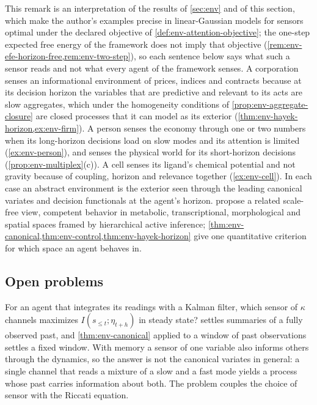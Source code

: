 \begin{remark}\label{rem:env-interpretation}
This remark is an interpretation of the results of \cref{sec:env} and of this section, which make the author's examples precise in linear-Gaussian models for sensors optimal under the declared objective of \cref{def:env-attention-objective}; the one-step expected free energy of the framework does not imply that objective (\cref{rem:env-efe-horizon-free,rem:env-two-step}), so each sentence below says what such a sensor reads and not what every agent of the framework senses. A corporation senses an informational environment of prices, indices and contracts because at its decision horizon the variables that are predictive and relevant to its acts are slow aggregates, which under the homogeneity conditions of \cref{prop:env-aggregate-closure} are closed processes that it can model as its exterior (\cref{thm:env-hayek-horizon,ex:env-firm}). A person senses the economy through one or two numbers when its long-horizon decisions load on slow modes and its attention is limited (\cref{ex:env-person}), and senses the physical world for its short-horizon decisions (\cref{prop:env-multiplex}(c)). A cell senses its ligand's chemical potential and not gravity because of coupling, horizon and relevance together (\cref{ex:env-cell}). In each case an abstract environment is the exterior seen through the leading canonical variates and decision functionals at the agent's horizon.  propose a related scale-free view, competent behavior in metabolic, transcriptional, morphological and spatial spaces framed by hierarchical active inference; \cref{thm:env-canonical,thm:env-control,thm:env-hayek-horizon} give one quantitative criterion for which space an agent behaves in.
\end{remark}

\subsection{Open problems}\label{sec:env-open}

\begin{openproblem}\label{open:env-filtering}
For an agent that integrates its readings with a Kalman filter, which sensor of $\kappa$ channels maximizes $I(s_{\le t};\eta_{t+h})$ in steady state?  settles summaries of a fully observed past, and \cref{thm:env-canonical} applied to a window of past observations settles a fixed window. With memory a sensor of one variable also informs others through the dynamics, so the answer is not the canonical variates in general: a single channel that reads a mixture of a slow and a fast mode yields a process whose past carries information about both. The problem couples the choice of sensor with the Riccati equation.
\end{openproblem}

